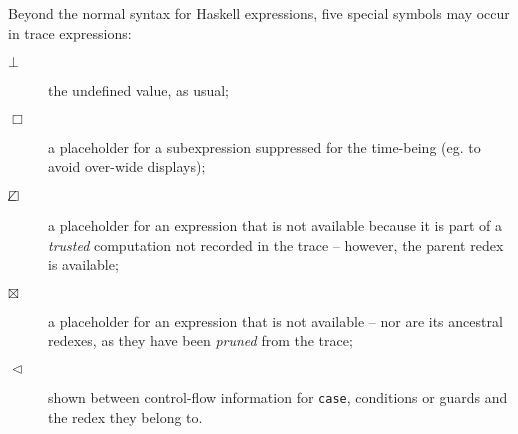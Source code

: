 \documentclass[12pt]{article}
\newcommand{\emptyBox}{\Box}
\newcommand{\dashedBox}{\Box\hspace{-9pt}\angle}
\newcommand{\crossBox}{\boxtimes}
\newcommand{\within}{\vartriangleleft}
\begin{document}
\noindent
Beyond the normal syntax for Haskell expressions, five special
symbols may occur in trace expressions:

\begin{description}

\item[$\bot$]
the undefined value, as usual;

\item[$\emptyBox$]
a placeholder for a subexpression suppressed for
the time-being (eg. to avoid over-wide displays);

\item[$\dashedBox$]
a placeholder for an expression that
is not available because it is part of a
\emph{trusted} computation not recorded in
the trace -- however, the parent redex
is available; 
    
\item[$\crossBox$]
a placeholder for an expression that
is not available -- nor are its ancestral
redexes, as they have been
\emph{pruned} from the trace;

\item[$\within$]
shown between control-flow information for \texttt{case}, conditions or guards and the redex they belong to.
\end{description}

\end{document}
